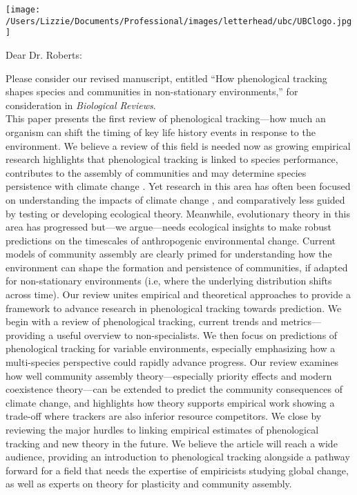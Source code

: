 \documentclass[11pt,a4paper]{letter}
\begin{document}
\begin{letter}{}
\texttt{[image: /Users/Lizzie/Documents/Professional/images/letterhead/ubc/UBClogo.jpg]}\\
\opening{Dear Dr. Roberts:}
Please consider our revised manuscript, entitled ``How phenological tracking shapes species and communities in non-stationary environments,'' for consideration in \emph{Biological Reviews}.
\vspace{1.5ex}\\
This paper presents the first review of phenological tracking---how much an organism can shift the timing of key life history events in response to the environment. We believe a review of this field is needed now as growing empirical research highlights that phenological tracking is linked to species performance, contributes to the assembly of communities and may determine species persistence with climate change \citep[e.g.,][]{Cleland:2012,Zettlemoyer2019}. Yet research in this area has often been focused on understanding the impacts of climate change \citep[e.g.,][]{thackeray2016,cohen2018,kharouba2018}, and comparatively less guided by testing or developing ecological theory. Meanwhile, evolutionary theory in this area has progressed but---we argue---needs ecological insights to make robust predictions on the timescales of anthropogenic environmental change. Current models of community assembly are clearly primed for understanding how the environment can shape the formation and persistence of communities, if adapted for non-stationary environments (i.e, where the underlying distribution shifts across time). 
% 
Our review unites empirical and theoretical approaches to provide a framework to advance research in phenological tracking towards prediction. We begin with a review of phenological tracking, current trends and metrics---providing a useful overview to non-specialists. We then focus on predictions of phenological tracking for variable environments, especially emphasizing how a multi-species perspective could rapidly advance progress. Our review examines how well community assembly theory---especially priority effects and modern coexistence theory---can be extended to predict the community consequences of climate change, and highlights how theory supports empirical work showing a trade-off where trackers are also inferior resource competitors. We close by reviewing the major hurdles to linking empirical estimates of phenological tracking and new theory in the future. We believe the article will reach a wide audience, providing an introduction to phenological tracking alongside a pathway forward for a field that needs the expertise of empiricists studying global change, as well as experts on theory for plasticity and community assembly.

\end{letter}
\end{document}
